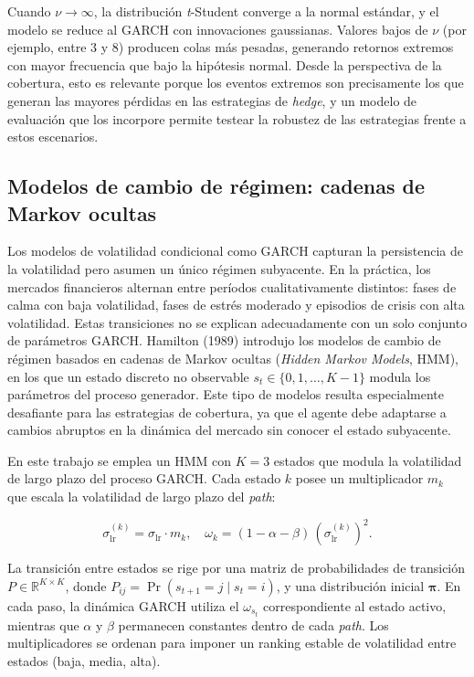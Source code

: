 \documentclass[11pt,a4paper,spanish]{article}
\numberwithin{equation}{section} %
\begin{document}
Cuando $\nu \to \infty$, la distribución \textit{t}-Student converge a la normal estándar, y el modelo se reduce al GARCH con innovaciones gaussianas. Valores bajos de $\nu$ (por ejemplo, entre 3 y 8) producen colas más pesadas, generando retornos extremos con mayor frecuencia que bajo la hipótesis normal. Desde la perspectiva de la cobertura, esto es relevante porque los eventos extremos son precisamente los que generan las mayores pérdidas en las estrategias de \textit{hedge}, y un modelo de evaluación que los incorpore permite testear la robustez de las estrategias frente a estos escenarios.

\subsection{Modelos de cambio de régimen: cadenas de Markov ocultas}\label{subsec:hmm}

Los modelos de volatilidad condicional como GARCH capturan la persistencia de la volatilidad pero asumen un único régimen subyacente. En la práctica, los mercados financieros alternan entre períodos cualitativamente distintos: fases de calma con baja volatilidad, fases de estrés moderado y episodios de crisis con alta volatilidad. Estas transiciones no se explican adecuadamente con un solo conjunto de parámetros GARCH. Hamilton (1989) introdujo los modelos de cambio de régimen basados en cadenas de Markov ocultas (\textit{Hidden Markov Models}, HMM), en los que un estado discreto no observable $s_t \in \{0, 1, \ldots, K-1\}$ modula los parámetros del proceso generador. Este tipo de modelos resulta especialmente desafiante para las estrategias de cobertura, ya que el agente debe adaptarse a cambios abruptos en la dinámica del mercado sin conocer el estado subyacente.

En este trabajo se emplea un HMM con $K = 3$ estados que modula la volatilidad de largo plazo del proceso GARCH. Cada estado $k$ posee un multiplicador $m_k$ que escala la volatilidad de largo plazo del \textit{path}:

\begin{equation}
\sigma_{\text{lr}}^{(k)} = \sigma_{\text{lr}} \cdot m_k, \quad \omega_k = (1 - \alpha - \beta)\,(\sigma_{\text{lr}}^{(k)})^2.
\end{equation}

La transición entre estados se rige por una matriz de probabilidades de transición $P \in \mathbb{R}^{K \times K}$, donde $P_{ij} = \Pr(s_{t+1} = j \mid s_t = i)$, y una distribución inicial $\boldsymbol{\pi}$. En cada paso, la dinámica GARCH utiliza el $\omega_{s_t}$ correspondiente al estado activo, mientras que $\alpha$ y $\beta$ permanecen constantes dentro de cada \textit{path}. Los multiplicadores se ordenan para imponer un ranking estable de volatilidad entre estados (baja, media, alta).
\end{document}
